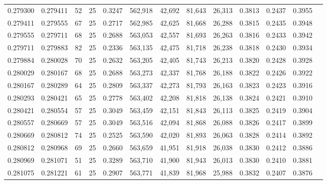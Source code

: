 \begin{tabular}{rrrrrrrrrrrrr}
0.279300 & 0.279411 &    52 &  25 &                                     0.3247 & 562,918 &  42,692 &  81,643 &  26,313 & 0.3813 & 0.2437 & 0.3955 \\
0.279411 & 0.279555 &    67 &  25 &                                     0.2717 & 562,985 &  42,625 &  81,668 &  26,288 & 0.3815 & 0.2435 & 0.3948 \\
0.279555 & 0.279711 &    68 &  25 &                                     0.2688 & 563,053 &  42,557 &  81,693 &  26,263 & 0.3816 & 0.2433 & 0.3942 \\
0.279711 & 0.279883 &    82 &  25 &                                     0.2336 & 563,135 &  42,475 &  81,718 &  26,238 & 0.3818 & 0.2430 & 0.3934 \\
0.279884 & 0.280028 &    70 &  25 &                                     0.2632 & 563,205 &  42,405 &  81,743 &  26,213 & 0.3820 & 0.2428 & 0.3928 \\
0.280029 & 0.280167 &    68 &  25 &                                     0.2688 & 563,273 &  42,337 &  81,768 &  26,188 & 0.3822 & 0.2426 & 0.3922 \\
0.280167 & 0.280289 &    64 &  25 &                                     0.2809 & 563,337 &  42,273 &  81,793 &  26,163 & 0.3823 & 0.2423 & 0.3916 \\
0.280293 & 0.280421 &    65 &  25 &                                     0.2778 & 563,402 &  42,208 &  81,818 &  26,138 & 0.3824 & 0.2421 & 0.3910 \\
0.280421 & 0.280554 &    57 &  25 &                                     0.3049 & 563,459 &  42,151 &  81,843 &  26,113 & 0.3825 & 0.2419 & 0.3904 \\
0.280557 & 0.280669 &    57 &  25 &                                     0.3049 & 563,516 &  42,094 &  81,868 &  26,088 & 0.3826 & 0.2417 & 0.3899 \\
0.280669 & 0.280812 &    74 &  25 &                                     0.2525 & 563,590 &  42,020 &  81,893 &  26,063 & 0.3828 & 0.2414 & 0.3892 \\
0.280812 & 0.280968 &    69 &  25 &                                     0.2660 & 563,659 &  41,951 &  81,918 &  26,038 & 0.3830 & 0.2412 & 0.3886 \\
0.280969 & 0.281071 &    51 &  25 &                                     0.3289 & 563,710 &  41,900 &  81,943 &  26,013 & 0.3830 & 0.2410 & 0.3881 \\
0.281075 & 0.281221 &    61 &  25 &                                     0.2907 & 563,771 &  41,839 &  81,968 &  25,988 & 0.3832 & 0.2407 & 0.3876 \\

\end{tabular}

